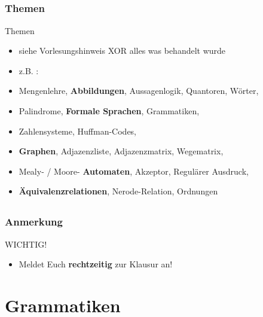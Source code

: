 \subsection*{}
\begin{frame}
  \frametitle{Themen}
	\begin{block}{Themen}

		\begin{itemize}
		\item siehe Vorlesungshinweis XOR alles was behandelt wurde
	  	\item z.B. :\pause
		  	\item Mengenlehre, \textbf{Abbildungen}, Aussagenlogik, Quantoren, Wörter,
		  	\item Palindrome, \textbf{Formale Sprachen}, Grammatiken,
		  	\item Zahlensysteme, Huffman-Codes,
		  	\item \textbf{Graphen}, Adjazenzliste, Adjazenzmatrix, Wegematrix,
		  	\item Mealy- / Moore- \textbf{Automaten}, Akzeptor, Regulärer Ausdruck,
		  	\item \textbf{Äquivalenzrelationen}, Nerode-Relation, Ordnungen
	 	\end{itemize}
	\end{block}
\end{frame}

\subsection*{}
\begin{frame}
   \frametitle{Anmerkung}
	\begin{block}{WICHTIG!}
  	\begin{itemize}
			\item Meldet Euch \textbf{rechtzeitig} zur Klausur an!
		\end{itemize}
	\end{block}

\end{frame}

\section{Grammatiken}
